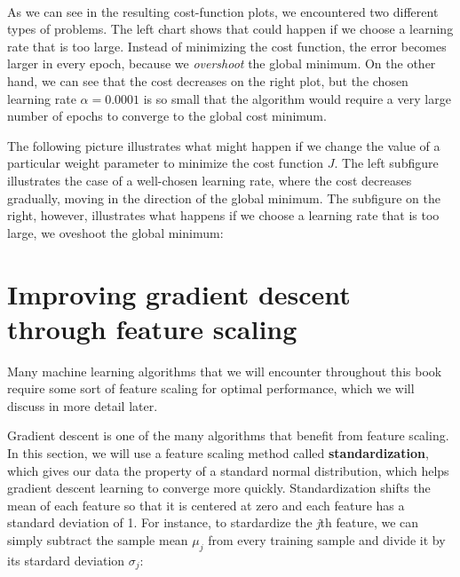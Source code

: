 \documentclass[11pt]{article}
\begin{document}
    \begin{center}
    \end{center}
    { \hspace*{\fill} \\}
    
    As we can see in the resulting cost-function plots, we encountered two
different types of problems. The left chart shows that could happen if
we choose a learning rate that is too large. Instead of minimizing the
cost function, the error becomes larger in every epoch, because we
\emph{overshoot} the global minimum. On the other hand, we can see that
the cost decreases on the right plot, but the chosen learning rate
\(\alpha = 0.0001\) is so small that the algorithm would require a very
large number of epochs to converge to the global cost minimum.

    The following picture illustrates what might happen if we change the
value of a particular weight parameter to minimize the cost function
\(J\). The left subfigure illustrates the case of a well-chosen learning
rate, where the cost decreases gradually, moving in the direction of the
global minimum. The subfigure on the right, however, illustrates what
happens if we choose a learning rate that is too large, we oveshoot the
global minimum:

    \section{Improving gradient descent through feature
scaling}\label{improving-gradient-descent-through-feature-scaling}

    Many machine learning algorithms that we will encounter throughout this
book require some sort of feature scaling for optimal performance, which
we will discuss in more detail later.

Gradient descent is one of the many algorithms that benefit from feature
scaling. In this section, we will use a feature scaling method called
\textbf{standardization}, which gives our data the property of a
standard normal distribution, which helps gradient descent learning to
converge more quickly. Standardization shifts the mean of each feature
so that it is centered at zero and each feature has a standard deviation
of 1. For instance, to stardardize the \emph{j}th feature, we can simply
subtract the sample mean \(\mu_j\) from every training sample and divide
it by its stardard deviation \(\sigma_j\):
\end{document}
